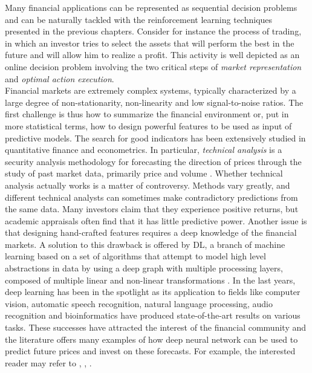Many financial applications can be represented as sequential decision problems and can be naturally tackled with the reinforcement learning techniques presented in the previous chapters. Consider for instance the process of trading, in which an investor tries to select the assets that will perform the best in the future and will allow him to realize a profit. This activity is well depicted as an online decision problem involving the two critical steps of \emph{market representation} and \emph{optimal action execution}.\\
Financial markets are extremely complex systems, typically characterized by a large degree of non-stationarity, non-linearity and low signal-to-noise ratios. The first challenge is thus how to summarize the financial environment or, put in more statistical terms, how to design powerful features to be used as input of predictive models. The search for good indicators has been extensively studied in quantitative finance and econometrics. In particular, \emph{technical analysis} is a security analysis methodology for forecasting the direction of prices through the study of past market data, primarily price and volume \cite{lo2000foundations}. Whether technical analysis actually works is a matter of controversy. Methods vary greatly, and different technical analysts can sometimes make contradictory predictions from the same data. Many investors claim that they experience positive returns, but academic appraisals often find that it has little predictive power. Another issue is that designing hand-crafted features requires a deep knowledge of the financial markets. A solution to this drawback is offered by \gls{DL}, a branch of machine learning based on a set of algorithms that attempt to model high level abstractions in data by using a deep graph with multiple processing layers, composed of multiple linear and non-linear transformations \cite{bengio2015deep}. In the last years, deep learning has been in the spotlight as its application to fields like computer vision, automatic speech recognition, natural language processing, audio recognition and bioinformatics have produced state-of-the-art results on various tasks. These successes have attracted the interest of the financial community and the literature offers many examples of how deep neural network can be used to predict future prices and invest on these forecasts. For example, the interested reader may refer to \cite{kamijo1990stock}, \cite{saad1998comparative}, \cite{liang2011stock}.\\ 
